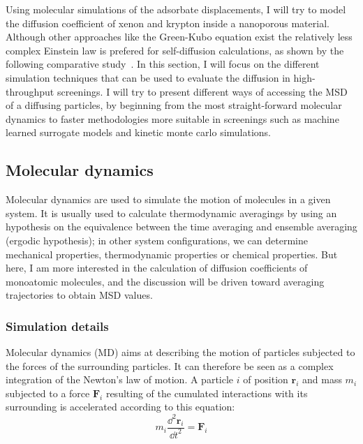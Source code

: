 \documentclass[main]{subfiles}
\begin{document}
Using molecular simulations of the adsorbate displacements, I will try to model the diffusion coefficient of xenon and krypton inside a nanoporous material. Although other approaches like the Green-Kubo equation exist the relatively less complex Einstein law is prefered for self-diffusion calculations, as shown by the following comparative study~\cite{Maginn_2020}. In this section, I will focus on the different simulation techniques that can be used to evaluate the diffusion in high-throughput screenings. I will try to present different ways of accessing the MSD of a diffusing particles, by beginning from the most straight-forward molecular dynamics to faster methodologies more suitable in screenings such as machine learned surrogate models and kinetic monte carlo simulations.


\subsection{Molecular dynamics}

Molecular dynamics are used to simulate the motion of molecules in a given system. It is usually used to calculate thermodynamic averagings by using an hypothesis on the equivalence between the time averaging and ensemble averaging (ergodic hypothesis); in other system configurations, we can determine mechanical properties, thermodynamic properties or chemical properties. But here, I am more interested in the calculation of diffusion coefficients of monoatomic molecules, and the discussion will be driven toward averaging trajectories to obtain MSD values.

\subsubsection{Simulation details}

Molecular dynamics (MD) aims at describing the motion of particles subjected to the forces of the surrounding particles. It can therefore be seen as a complex integration of the Newton's law of motion. A particle $i$ of position $\mathbf{r}_i$ and mass $m_i$ subjected to a force $\mathbf{F}_i$ resulting of the cumulated interactions with its surrounding is accelerated according to this equation:
\begin{equation}\label{eq:newton}
  m_i\frac{\dd^2 \mathbf{r}_i}{{\dd t}^2} = \mathbf{F}_i
\end{equation}
\end{document}
